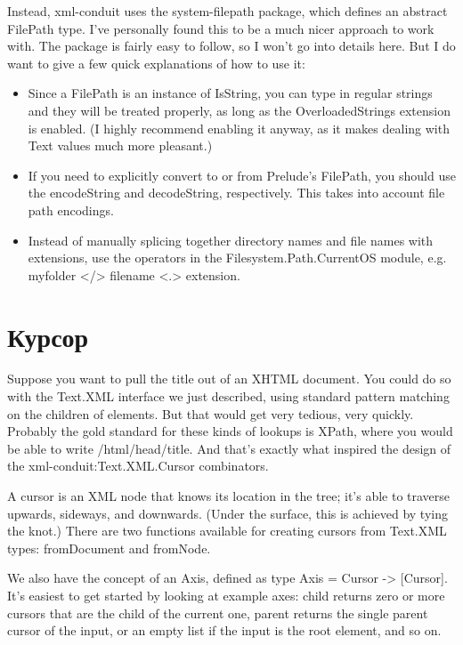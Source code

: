 Instead, xml-conduit uses the system-filepath package, which defines an abstract FilePath type. I've personally found this to be a much nicer approach to work with. The package is fairly easy to follow, so I won't go into details here. But I do want to give a few quick explanations of how to use it:

\begin{itemize}
\item Since a FilePath is an instance of IsString, you can type in regular strings and they will be treated properly, as long as the OverloadedStrings extension is enabled. (I highly recommend enabling it anyway, as it makes dealing with Text values much more pleasant.)
\item If you need to explicitly convert to or from Prelude's FilePath, you should use the encodeString and decodeString, respectively. This takes into account file path encodings.
\item Instead of manually splicing together directory names and file names with extensions, use the operators in the Filesystem.Path.CurrentOS module, e.g. myfolder </> filename <.> extension.
\end{itemize}
  
\section{Курсор} %

Suppose you want to pull the title out of an XHTML document. You could do so with the Text.XML interface we just described, using standard pattern matching on the children of elements. But that would get very tedious, very quickly. Probably the gold standard for these kinds of lookups is XPath, where you would be able to write /html/head/title. And that's exactly what inspired the design of the xml-conduit:Text.XML.Cursor combinators.

A cursor is an XML node that knows its location in the tree; it's able to traverse upwards, sideways, and downwards. (Under the surface, this is achieved by tying the knot.) There are two functions available for creating cursors from Text.XML types: fromDocument and fromNode.

We also have the concept of an Axis, defined as type Axis = Cursor -> [Cursor]. It's easiest to get started by looking at example axes: child returns zero or more cursors that are the child of the current one, parent returns the single parent cursor of the input, or an empty list if the input is the root element,
and so on.

